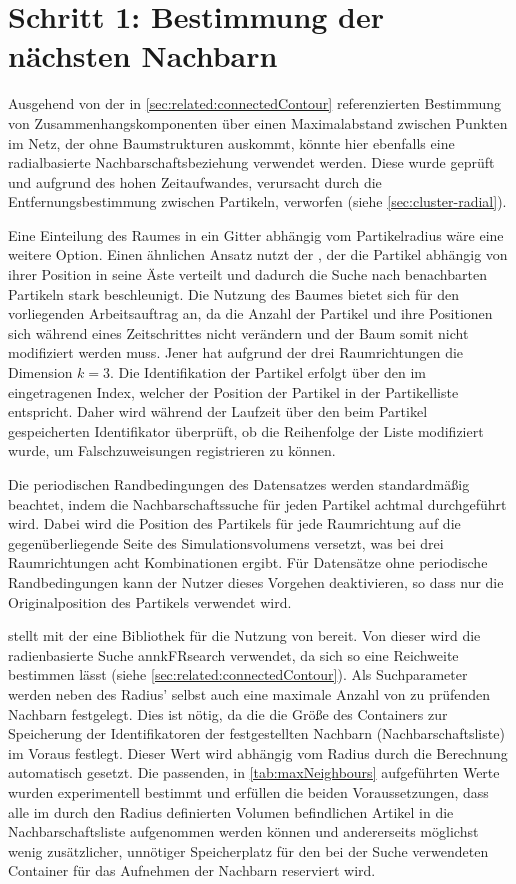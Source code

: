 \section{Schritt 1: Bestimmung der nächsten Nachbarn}\label{sec:nachbarschaftssuche}

Ausgehend von der in \autoref{sec:related:connectedContour} referenzierten Bestimmung von Zusammenhangskomponenten über einen Maximalabstand zwischen Punkten im Netz, der ohne Baumstrukturen auskommt, könnte hier ebenfalls eine radialbasierte Nachbarschaftsbeziehung verwendet werden. Diese wurde geprüft und aufgrund des hohen Zeitaufwandes, verursacht durch die Entfernungsbestimmung zwischen Partikeln, verworfen (siehe \autoref{sec:cluster-radial}).

Eine Einteilung des Raumes in ein Gitter abhängig vom Partikelradius wäre eine weitere Option. Einen ähnlichen Ansatz nutzt der , der die Partikel abhängig von ihrer Position in seine Äste verteilt und dadurch die Suche nach benachbarten Partikeln stark beschleunigt. Die Nutzung des Baumes bietet sich für den vorliegenden Arbeitsauftrag an, da die Anzahl der Partikel und ihre Positionen sich während eines Zeitschrittes nicht verändern und der Baum somit nicht modifiziert werden muss. Jener hat aufgrund der drei Raumrichtungen die Dimension $k=3$. Die Identifikation der Partikel erfolgt über den im  eingetragenen Index, welcher der Position der Partikel in der Partikelliste entspricht. Daher wird während der Laufzeit über den beim Partikel gespeicherten Identifikator überprüft, ob die Reihenfolge der Liste modifiziert wurde, um Falschzuweisungen registrieren zu können.

Die periodischen Randbedingungen des Datensatzes werden standardmäßig beachtet, indem die Nachbarschaftssuche für jeden Partikel achtmal durchgeführt wird. Dabei wird die Position des Partikels für jede Raumrichtung auf die gegenüberliegende Seite des Simulationsvolumens versetzt, was bei drei Raumrichtungen acht Kombinationen ergibt.
Für Datensätze ohne periodische Randbedingungen kann der Nutzer dieses Vorgehen deaktivieren, so dass nur die Originalposition des Partikels verwendet wird.

 stellt mit der \ANN eine Bibliothek für die Nutzung von  bereit. Von dieser wird die radienbasierte Suche annkFRsearch verwendet, da sich so eine Reichweite bestimmen lässt (siehe \autoref{sec:related:connectedContour}). Als Suchparameter werden neben des Radius' selbst auch eine maximale Anzahl von zu prüfenden Nachbarn festgelegt. Dies ist nötig, da die \ANN die Größe des Containers zur Speicherung der Identifikatoren der festgestellten Nachbarn (Nachbarschaftsliste) im Voraus festlegt. Dieser Wert wird abhängig vom Radius durch die Berechnung automatisch gesetzt. Die passenden, in \autoref{tab:maxNeighbours} aufgeführten Werte wurden experimentell bestimmt und erfüllen die beiden Voraussetzungen, dass alle im durch den Radius definierten Volumen befindlichen Artikel in die Nachbarschaftsliste aufgenommen werden können und andererseits möglichst wenig zusätzlicher, unnötiger Speicherplatz für den bei der Suche verwendeten Container für das Aufnehmen der Nachbarn reserviert wird. 

